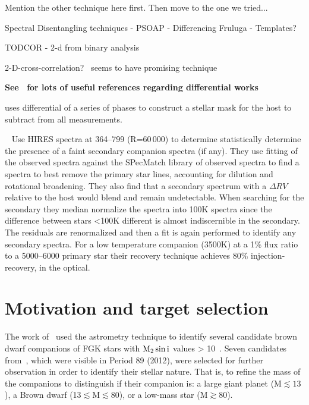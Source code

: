 Mention the other technique here first.
Then move to the one we tried...




Spectral Disentangling techniques
- PSOAP
- Differencing Fruluga
- Templates?

TODCOR - 2-d from binary analysis~\citep{zucker_study_1994}
\citep{mazeh_detecting_1997}

2-D-cross-correlation?~\citet{piskorz_evidence_2016} seems to have promising technique


\textbf{
See~\citet{kostogryz_spectral_2013} for lots of useful references regarding differential works~\citet{simon_disentangling_1994}}

\citet{rodler_weighing_2012} uses differential of a series of phases to construct a stellar mask for the host to subtract from all measurements.



{\red{}~\citet{kolbl_detection_2015} Use HIRES spectra at 364--799\nm{} (R=60\,000) to determine statistically determine the presence of a faint secondary companion spectra (if any).
They use \textchisquared fitting of the observed spectra against the {SPecMatch} library of observed spectra to find a spectra to best remove the primary star lines,
accounting for dilution and rotational broadening.
They also find that a secondary spectrum with a $\Delta RV$ relative to the host would blend and remain undetectable.
When searching for the secondary they median normalize the spectra into 100K spectra since the difference between stars  <100K different is almost indiscernible in the secondary.
The residuals are renormalized and then a \textchisquared fit is again performed to identify any secondary spectra.
For a low temperature companion (3500K) at a 1\% flux ratio to a 5000--6000\K{} primary star their recovery technique achieves 80\% injection-recovery, in the optical.}


\section{Motivation and target selection}
\label{sec:target_motivation}

The work of~\citet{sahlmann_search_2011} used the astrometry technique to identify several candidate brown dwarf companions of {FGK} stars with \(\rm M_2 \sin{i}\) values > 10~\Mjup{}.
Seven candidates from~\citet{sahlmann_search_2011}, which were visible in Period 89 (2012), were selected for further observation in order to identify their stellar nature.
That is, to refine the mass of the companions to distinguish if their companion is: a large giant planet (M$\apprle13$\Mjup), a Brown dwarf (13$\apprle $M$\apprle80$\Mjup), or a low-mass star (M$\apprge80$\Mjup).

